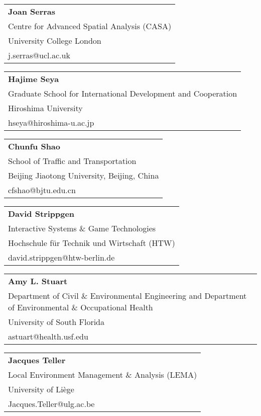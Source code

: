 \begin{tabular}[width=0.48\textwidth]{@{}l}
\textbf{Joan Serras} \\
Centre for Advanced Spatial Analysis (CASA) \\
University College London \\
j.serras@ucl.ac.uk \\
\end{tabular}

\begin{tabular}[width=0.48\textwidth]{@{}l}
\textbf{Hajime Seya} \\
Graduate School for International Development and Cooperation \\
Hiroshima University \\
hseya@hiroshima-u.ac.jp  \\
\end{tabular}

\begin{tabular}[width=0.48\textwidth]{@{}l}
\textbf{Chunfu Shao} \\
School of Traffic and Transportation \\
Beijing Jiaotong University, Beijing, China \\
cfshao@bjtu.edu.cn \\
\end{tabular}

\begin{tabular}[width=0.48\textwidth]{@{}l}
\textbf{David Strippgen} \\
Interactive Systems \& Game Technologies \\
Hochschule für Technik und Wirtschaft (HTW) \\
david.strippgen@htw-berlin.de \\
\end{tabular}

\begin{tabular}[width=0.48\textwidth]{@{}l}
\textbf{Amy L. Stuart} \\
Department of Civil \& Environmental Engineering and Department of Environmental \& Occupational Health\\
University of South Florida \\
astuart@health.usf.edu \\
\end{tabular}

\begin{tabular}[width=0.48\textwidth]{@{}l}
\textbf{Jacques Teller} \\
Local Environment Management \& Analysis (LEMA) \\
University of Liège \\
Jacques.Teller@ulg.ac.be \\
\end{tabular}


